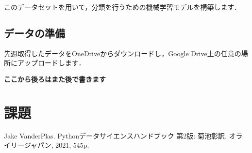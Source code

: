 \documentclass{jarticle}
\begin{document}
このデータセットを用いて，分類を行うための機械学習モデルを構築します．
\subsection{データの準備}
先週取得したデータをOneDriveからダウンロードし，Google Drive上の任意の場所にアップロードします．


\begin{center}
\textbf{\color{red}ここから後ろはまた後で書きます}
\end{center}

\section{課題}

\begin{thebibliography}{99}
   Jake VanderPlas. Pythonデータサイエンスハンドブック 第2版: 菊池彰訳. オライリージャパン, 2021, 545p. \\\\
\end{thebibliography}
\end{document}
